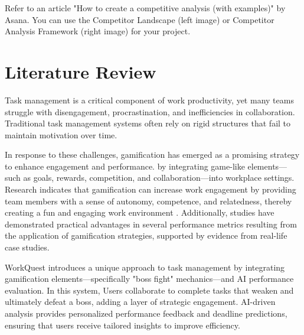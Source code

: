 
Refer to an article "How to create a competitive analysis (with
examples)" by Asana. You can use the Competitor Landscape (left image) or
Competitor Analysis Framework (right image) for your project.

\section{Literature Review}
\label{section:literature-review}
    Task management is a critical component of work productivity, yet many teams struggle with disengagement, procrastination, and inefficiencies in collaboration.
    Traditional task management systems often rely on rigid structures that fail to maintain motivation over time. 

    In response to these challenges, gamification has emerged as a promising strategy to enhance engagement and performance. by integrating game-like elements—such as goals, rewards, competition, and collaboration—into workplace settings. Research indicates that gamification can increase work engagement by providing team members with a sense of autonomy, competence, and relatedness, thereby creating a fun and engaging work environment \cite{ncbi:pmc10905147}.
    Additionally, studies have demonstrated practical advantages in several performance metrics resulting from the application of gamification strategies, supported by evidence from real-life case studies. \cite{Employee:Gamification}

    WorkQuest introduces a unique approach to task management by integrating gamification elements—specifically "boss fight" mechanics—and AI performance evaluation. In this system, Users collaborate to complete tasks that weaken and ultimately defeat a boss, adding a layer of strategic engagement. AI-driven analysis provides personalized performance feedback and deadline predictions, ensuring that users receive tailored insights to improve efficiency.
    
